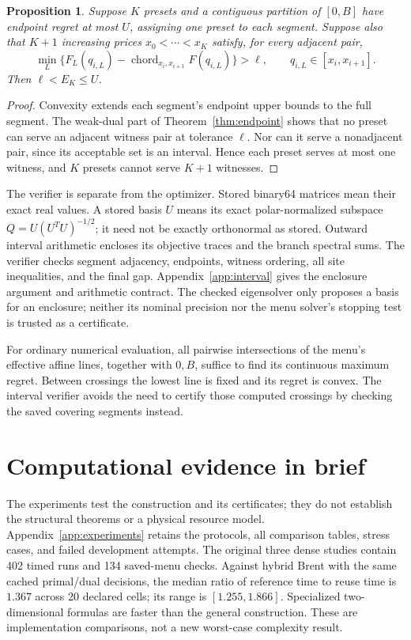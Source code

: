 \documentclass[11pt]{article}
\newtheorem{proposition}[theorem]{Proposition}
\begin{document}
\begin{proposition}\label{prop:certificate}
Suppose $K$ presets and a contiguous partition of $[0,B]$ have endpoint
regret at most $U$, assigning one preset to each segment. Suppose also that
$K+1$ increasing prices $x_0<\cdots<x_K$ satisfy, for every adjacent pair,
\begin{equation}
 \min_L\{F_L(q_{i,L})-\operatorname{chord}_{x_i,x_{i+1}}F(q_{i,L})\}
 >\ell,\qquad q_{i,L}\in[x_i,x_{i+1}].                    \label{eq:packing}
\end{equation}
Then $\ell<E_K\le U$.
\end{proposition}
\begin{proof}
Convexity extends each segment's endpoint upper bounds to the full segment.
The weak-dual part of Theorem~\ref{thm:endpoint} shows that no preset can
serve an adjacent witness pair at tolerance $\ell$. Nor can it serve a
nonadjacent pair, since its acceptable set is an interval. Hence each preset
serves at most one witness, and $K$ presets cannot serve $K+1$ witnesses.
\end{proof}

The verifier is separate from the optimizer. Stored binary64 matrices mean
their exact real values. A stored basis $U$ means its exact polar-normalized
subspace $Q=U(U^TU)^{-1/2}$; it need not be exactly orthonormal as stored.
Outward interval arithmetic encloses its objective traces and the branch
spectral sums. The verifier checks segment adjacency, endpoints, witness
ordering, all site inequalities, and the final gap. Appendix~\ref{app:interval}
gives the enclosure argument and arithmetic contract. The checked eigensolver
only proposes a basis for an enclosure; neither its nominal precision nor
the menu solver's stopping test is trusted as a certificate.

For ordinary numerical evaluation, all pairwise intersections of the menu's
effective affine lines, together with $0,B$, suffice to find its continuous
maximum regret. Between crossings the lowest line is fixed and its regret
is convex. The interval verifier avoids the need to certify those computed
crossings by checking the saved covering segments instead.

\section{Computational evidence in brief}\label{sec:evidence}
The experiments test the construction and its certificates; they do not
establish the structural theorems or a physical resource model.
Appendix~\ref{app:experiments} retains the protocols, all comparison tables,
stress cases, and failed development attempts. The original three dense
studies contain 402 timed runs and 134 saved-menu checks. Against hybrid
Brent with the same cached primal/dual decisions, the median ratio of
reference time to reuse time is $1.367$ across 20 declared cells; its range
is $[1.255,1.866]$. Specialized two-dimensional formulas are faster than
the general construction. These are implementation comparisons, not a
new worst-case complexity result.
\end{document}
